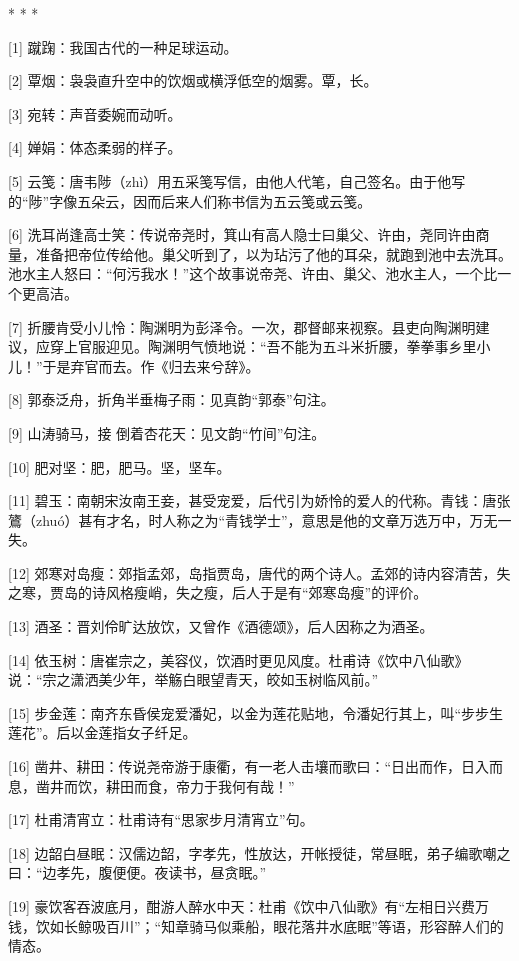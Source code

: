 \documentclass[12pt,UTF8]{ctexbook}
\begin{document}
* * *



[1] 蹴踘：我国古代的一种足球运动。

[2] 覃烟：袅袅直升空中的饮烟或横浮低空的烟雾。覃，长。

[3] 宛转：声音委婉而动听。

[4] 婵娟：体态柔弱的样子。

[5] 云笺：唐韦陟（zhì）用五采笺写信，由他人代笔，自己签名。由于他写的“陟”字像五朵云，因而后来人们称书信为五云笺或云笺。

[6] 洗耳尚逢高士笑：传说帝尧时，箕山有高人隐士曰巢父、许由，尧同许由商量，准备把帝位传给他。巢父听到了，以为玷污了他的耳朵，就跑到池中去洗耳。池水主人怒曰：“何污我水！”这个故事说帝尧、许由、巢父、池水主人，一个比一个更高洁。

[7] 折腰肯受小儿怜：陶渊明为彭泽令。一次，郡督邮来视察。县吏向陶渊明建议，应穿上官服迎见。陶渊明气愤地说：“吾不能为五斗米折腰，拳拳事乡里小儿！”于是弃官而去。作《归去来兮辞》。

[8] 郭泰泛舟，折角半垂梅子雨：见真韵“郭泰”句注。

[9] 山涛骑马，接 倒着杏花天：见文韵“竹间”句注。

[10] 肥对坚：肥，肥马。坚，坚车。

[11] 碧玉：南朝宋汝南王妾，甚受宠爱，后代引为娇怜的爱人的代称。青钱：唐张鷟（zhuó）甚有才名，时人称之为“青钱学士”，意思是他的文章万选万中，万无一失。

[12] 郊寒对岛瘦：郊指孟郊，岛指贾岛，唐代的两个诗人。孟郊的诗内容清苦，失之寒，贾岛的诗风格瘦峭，失之瘦，后人于是有“郊寒岛瘦”的评价。

[13] 酒圣：晋刘伶旷达放饮，又曾作《酒德颂》，后人因称之为酒圣。

[14] 依玉树：唐崔宗之，美容仪，饮酒时更见风度。杜甫诗《饮中八仙歌》说：“宗之潇洒美少年，举觞白眼望青天，皎如玉树临风前。”

[15] 步金莲：南齐东昏侯宠爱潘妃，以金为莲花贴地，令潘妃行其上，叫“步步生莲花”。后以金莲指女子纤足。

[16] 凿井、耕田：传说尧帝游于康衢，有一老人击壤而歌曰：“日出而作，日入而息，凿井而饮，耕田而食，帝力于我何有哉！”

[17] 杜甫清宵立：杜甫诗有“思家步月清宵立”句。

[18] 边韶白昼眠：汉儒边韶，字孝先，性放达，开帐授徒，常昼眠，弟子编歌嘲之曰：“边孝先，腹便便。夜读书，昼贪眠。”

[19] 豪饮客吞波底月，酣游人醉水中天：杜甫《饮中八仙歌》有“左相日兴费万钱，饮如长鲸吸百川”；“知章骑马似乘船，眼花落井水底眠”等语，形容醉人们的情态。
\end{document}
